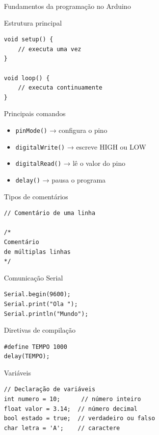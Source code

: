 \begin{frame}{Fundamentos da programação no Arduino}
  \begin{block}{Estrutura principal}
    \begin{verbatim}
void setup() {
    // executa uma vez
}

void loop() {
    // executa continuamente
}
    \end{verbatim}
  \end{block}

  \begin{block}{Principais comandos}
    \begin{itemize}
      \item \texttt{pinMode()} → configura o pino
      \item \texttt{digitalWrite()} → escreve HIGH ou LOW
      \item \texttt{digitalRead()} → lê o valor do pino
      \item \texttt{delay()} → pausa o programa
    \end{itemize}
  \end{block}

  \begin{block}{Tipos de comentários}
    \begin{verbatim}
// Comentário de uma linha

/*
Comentário
de múltiplas linhas
*/
    \end{verbatim}
  \end{block}

  \begin{block}{Comunicação Serial}
    \begin{verbatim}
Serial.begin(9600);
Serial.print("Ola ");
Serial.println("Mundo");
    \end{verbatim}
  \end{block}

  \begin{block}{Diretivas de compilação}
    \begin{verbatim}
#define TEMPO 1000
delay(TEMPO);
    \end{verbatim}
  \end{block}

  \begin{block}{Variáveis}
    \begin{verbatim}
// Declaração de variáveis
int numero = 10;      // número inteiro
float valor = 3.14;  // número decimal
bool estado = true;  // verdadeiro ou falso
char letra = 'A';    // caractere


\end{verbatim}
\end{block}
\end{frame}
